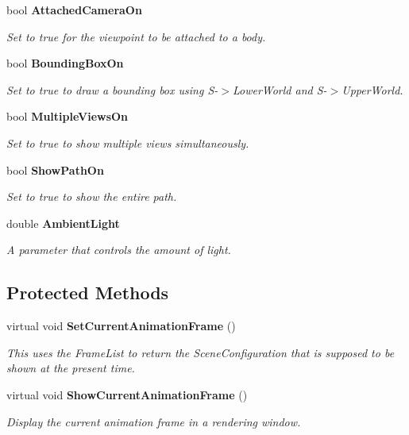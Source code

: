 \begin{CompactItemize}
bool {\bf Attached\-Camera\-On}
\begin{CompactList}\small\item\em Set to true for the viewpoint to be attached to a body.\item\end{CompactList}\item 
bool {\bf Bounding\-Box\-On}
\begin{CompactList}\small\item\em Set to true to draw a bounding box using S-$>$Lower\-World and S-$>$Upper\-World.\item\end{CompactList}\item 
bool {\bf Multiple\-Views\-On}
\begin{CompactList}\small\item\em Set to true to show multiple views simultaneously.\item\end{CompactList}\item 
bool {\bf Show\-Path\-On}
\begin{CompactList}\small\item\em Set to true to show the entire path.\item\end{CompactList}\item 
double {\bf Ambient\-Light}
\begin{CompactList}\small\item\em A parameter that controls the amount of light.\item\end{CompactList}\end{CompactItemize}
\subsection*{Protected Methods}
\begin{CompactItemize}
\item 
virtual void {\bf Set\-Current\-Animation\-Frame} ()
\begin{CompactList}\small\item\em This uses the Frame\-List to return the Scene\-Configuration that is supposed to be shown at the present time.\item\end{CompactList}\item 
virtual void {\bf Show\-Current\-Animation\-Frame} ()
\begin{CompactList}\small\item\em Display the current animation frame in a rendering window.\item\end{CompactList}\end{CompactItemize}
